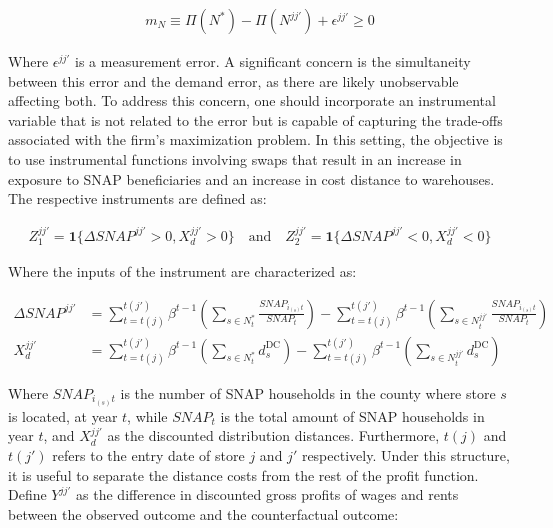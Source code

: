 \documentclass[11.5pt]{article}
\begin{document}
\begin{align}
    m_N \equiv \Pi(N^*) - \Pi(N^{jj'}) + \epsilon^{jj'} \geq 0
\end{align}



   Where $\epsilon^{jj'}$ is a measurement error. A significant concern is the simultaneity between this error and the demand error, as there are likely unobservable affecting both. To address this concern, one should incorporate an instrumental variable that is not related to the error but is capable of capturing the trade-offs associated with the firm's maximization problem. In this setting, the objective is to use instrumental functions involving swaps that result in an increase in exposure to SNAP beneficiaries and an increase in cost distance to warehouses. The respective instruments are defined as:

   \begin{align}
       Z^{jj'}_1 = \mathbf{1}\{\Delta SNAP^{jj'} > 0, X_d^{jj'} > 0\} \quad \text{and} \quad  Z^{jj'}_2 = \mathbf{1}\{\Delta SNAP^{jj'} < 0, X_d^{jj'} < 0\}
   \end{align}

   Where the inputs of the instrument are characterized as:

     \begin{align*}
      \Delta SNAP^{jj'} & = \sum_{t=t(j)}^{t(j')} \beta^{t-1} \left( \sum_{s \in N_t^*} \frac{SNAP_{i_{(s)}t}}{SNAP_t}\right) -   \sum_{t=t(j)}^{t(j')} \beta^{t-1} \left( \sum_{s \in N_t^{jj'}} \frac{SNAP_{i_{(s)}t}}{SNAP_t}\right) \\
           X^{jj'}_d & =  \sum_{t=t(j)}^{t(j')} \beta^{t-1} \left( \sum_{s \in N_t^*}  d^\text{DC}_s \right)  -  \sum_{t=t(j)}^{t(j')} \beta^{t-1} \left( \sum_{s \in N_t^{jj'}} d^\text{DC}_s \right) 
  \end{align*}
  
   
   
  Where $SNAP_{i_{(s)}t}$ is the number of SNAP households in the county where store $s$ is located, at year $t$, while $SNAP_t$ is the total amount of SNAP households in year $t$, and $X^{jj'}_d$ as the discounted distribution distances. Furthermore, $t(j)$ and $t(j')$ refers to the entry date of store $j$ and $j'$ respectively. Under this structure, it is useful to separate the distance costs from the rest of the profit function. Define $Y^{jj'}$ as the difference in discounted gross profits of wages and rents between the observed outcome and the counterfactual outcome:
\end{document}

